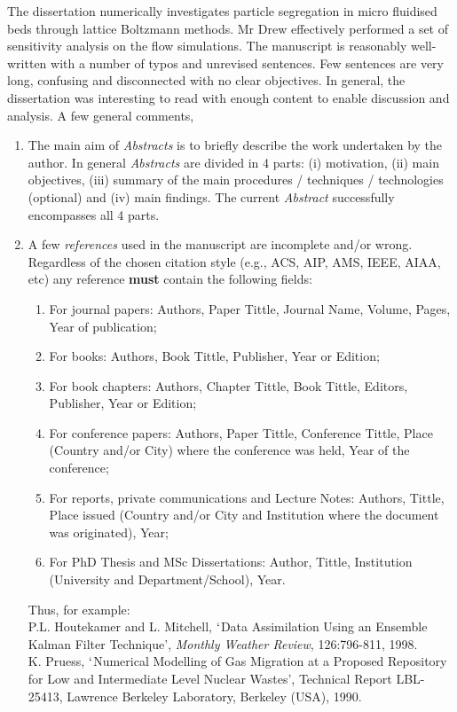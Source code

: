 \documentclass[14pt,twoside]{report}
\begin{document}
The dissertation numerically investigates particle segregation in micro fluidised beds through lattice Boltzmann methods. Mr Drew effectively performed a set of sensitivity analysis on the flow simulations.  The manuscript is reasonably well-written with a number of typos and unrevised sentences. Few sentences are very long, confusing and disconnected with no clear objectives. In general, the dissertation was interesting to read with enough content to enable discussion and analysis. A few general comments,
\begin{enumerate}
\item The main aim of {\it Abstracts} is to briefly describe the work undertaken by the author. In general {\it Abstracts} are divided in 4 parts: (i) motivation, (ii) main objectives, (iii) summary of the main procedures / techniques / technologies (optional) and (iv) main findings. The current {\it Abstract} successfully encompasses all 4 parts.
%
\item A few {\it references} used in the manuscript are incomplete and/or wrong. Regardless of the chosen citation style (e.g., ACS, AIP, AMS, IEEE, AIAA, etc) any reference {\bf must} contain the following fields: 
\begin{enumerate}
\item For journal papers: Authors, Paper Tittle, Journal Name, Volume, Pages, Year of publication;
\item For books: Authors, Book Tittle, Publisher, Year or Edition;
\item For book chapters: Authors, Chapter Tittle, Book Tittle, Editors, Publisher, Year or Edition;
\item For conference papers: Authors, Paper Tittle, Conference Tittle, Place (Country and/or City) where the conference was held, Year of the conference;
\item For reports,  private communications and Lecture Notes: Authors, Tittle, Place issued (Country and/or City and Institution where the document was originated), Year;
\item For PhD Thesis and MSc Dissertations: Author, Tittle, Institution (University and Department/School), Year.
\end{enumerate}  
Thus, for example:\\
\noindent
[39] P.L. Houtekamer and L. Mitchell, $\lq$Data Assimilation Using an Ensemble Kalman Filter Technique', {\it Monthly Weather Review}, 126:796-811, 1998.\\
\noindent
[40] K. Pruess, $\lq$Numerical Modelling of Gas Migration at a Proposed Repository for Low and Intermediate Level Nuclear Wastes', Technical Report LBL-25413, Lawrence Berkeley Laboratory, Berkeley (USA), 1990.\\

\end{enumerate}
\end{document}
